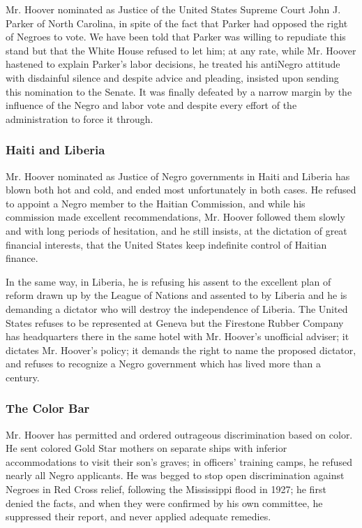 \documentclass[letterpaper,10pt,english]{jupyterBook}
\begin{document}
\sphinxAtStartPar
Mr. Hoover nominated as Justice of the United States Supreme Court John J. Parker of North Carolina, in spite of the fact that Parker had opposed the right of Negroes to vote. We have been told that Parker was willing to repudiate this stand but that the White House refused to let him; at any rate, while Mr. Hoover hastened to explain Parker’s labor decisions, he treated his anti\sphinxhyphen{}Negro attitude with disdainful silence and despite advice and pleading, insisted upon sending this nomination to the Senate. It was finally defeated by a narrow margin by the influence of the Negro and labor vote and despite every effort of the administration to force it through.


\subsubsection{Haiti and Liberia}
\label{\detokenize{Volumes/39/11/herbert_hoover:haiti-and-liberia}}
\sphinxAtStartPar
Mr. Hoover nominated as Justice of Negro governments in Haiti and Liberia has blown both hot and cold, and ended most unfortunately in both cases. He refused to appoint a Negro member to the Haitian Commission, and while his commission made excellent recommendations, Mr. Hoover followed them slowly and with long periods of hesitation, and he still insists, at the dictation of great financial interests, that the United States keep indefinite control of Haitian finance.

\sphinxAtStartPar
In the same way, in Liberia, he is refusing his assent to the excellent plan of reform drawn up by the League of Nations and assented to by Liberia and he is demanding a dictator who will destroy the independence of Liberia. The United States refuses to be represented at Geneva but the Firestone Rubber Company has headquarters there in the same hotel with Mr. Hoover’s unofficial adviser; it dictates Mr. Hoover’s policy; it demands the right to name the proposed dictator, and refuses to recognize a Negro government which has lived more than a century.


\subsubsection{The Color Bar}
\label{\detokenize{Volumes/39/11/herbert_hoover:the-color-bar}}
\sphinxAtStartPar
Mr. Hoover has permitted and ordered outrageous discrimination based on color. He sent colored Gold Star mothers on separate ships with inferior accommodations to visit their son’s graves; in officers’ training camps, he refused nearly all Negro applicants. He was begged to stop open discrimination against Negroes in Red Cross relief, following the Mississippi flood in 1927; he first denied the facts, and when they were confirmed by his own committee, he suppressed their report, and never applied adequate remedies.
\end{document}
